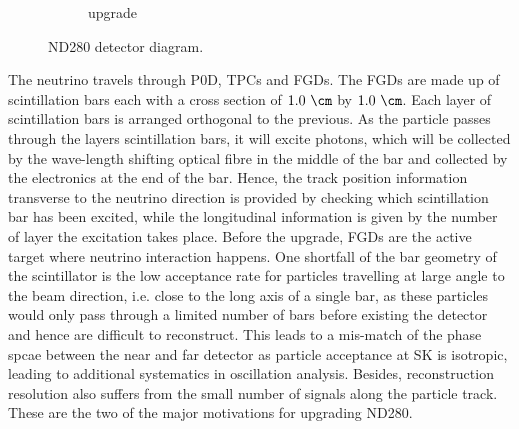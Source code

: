 \begin{figure}
\begin{subfigure}[b]{\dbfigwid\textwidth}
            \caption{upgrade}
            \label{subfig:nd280-up}
        \end{subfigure}
        \caption{ND280 detector diagram.}
        \label{fig:nd280-diagram}
  \end{figure}
  The neutrino travels through P0D, TPCs and FGDs. 
  The FGDs are made up of scintillation bars each with a cross section of $1.0~\cm$ by $1.0~\cm$. 
  Each layer of scintillation bars is arranged orthogonal to the previous.
  As the particle passes through the layers scintillation bars, it will excite photons, which will be collected by the wave-length shifting optical fibre in the middle of the bar and collected by the electronics at the end of the bar.
  Hence, the track position information transverse to the neutrino direction is provided by checking which scintillation bar has been excited, while the longitudinal information is given by the number of layer the excitation takes place.
  Before the upgrade, FGDs are the active target where neutrino interaction happens.
  One shortfall of the bar geometry of the scintillator is the low acceptance rate for particles travelling at large angle to the beam direction, i.e. close to the long axis of a single bar, as these particles would only pass through a limited number of bars before existing the detector and hence are difficult to reconstruct.
  This leads to a mis-match of the phase spcae between the near and far detector as particle acceptance at SK is isotropic, leading to additional systematics in oscillation analysis.
  Besides, reconstruction resolution also suffers from the small number of signals along the particle track.
  These are the two of the major motivations for upgrading ND280.

